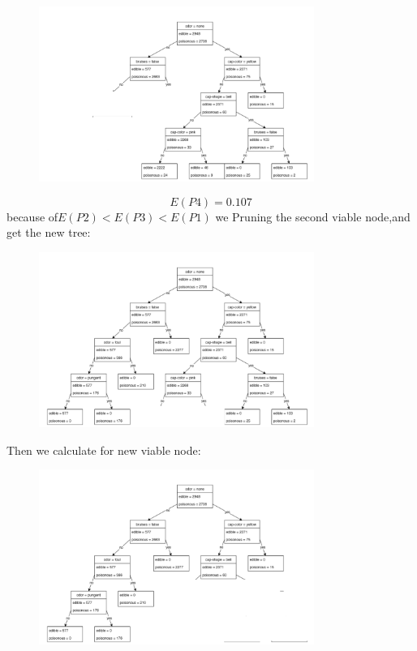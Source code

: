 \documentclass{article}
\begin{document}
\begin{figure}[H]
    \centering
    \includegraphics[width=0.8\textwidth]{purningVier_4.png}
\end{figure}
\[E(P4)=0.107\]
because of$E(P2)<E(P3)<E(P1)$ we Pruning the second viable node,and get the new tree:\\
\begin{figure}[H]
    \centering
    \includegraphics[width=0.8\textwidth]{pruningVier_2.png}
\end{figure}
Then we calculate for new viable node:\\
\begin{figure}[H]
    \centering
    \includegraphics[width=0.8\textwidth]{pruningDrei_1.png}
\end{figure}
\end{document}
